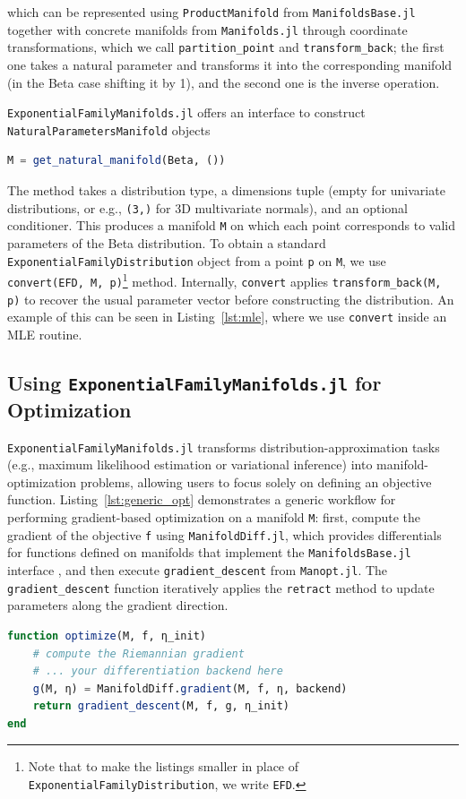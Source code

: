 \documentclass{juliacon}
\begin{document}
which can be represented using \texttt{ProductManifold} from \texttt{ManifoldsBase.jl} together with concrete manifolds from \texttt{Manifolds.jl} through coordinate transformations, which we call \texttt{partition\_point} and \texttt{transform\_back}; the first one takes a natural parameter and transforms it into the corresponding manifold (in the Beta case shifting it by 1), and the second one is the inverse operation.

\texttt{ExponentialFamilyManifolds.jl} offers an interface to construct \texttt{NaturalParametersManifold} objects \begin{lstlisting}[language=Julia]
M = get_natural_manifold(Beta, ())
\end{lstlisting} The method takes a distribution type, a dimensions tuple (empty for univariate distributions, or e.g., \texttt{(3,)} for 3D multivariate normals), and an optional conditioner. This produces a manifold \texttt{M} on which each point corresponds to valid parameters of the Beta distribution. To obtain a standard \texttt{ExponentialFamilyDistribution} object from a point \texttt{p} on \texttt{M}, we use \texttt{convert(EFD, M, p)}\footnote{\label{foot-efd}Note that to make the listings smaller in place of \texttt{ExponentialFamilyDistribution}, we write \texttt{EFD}.} method. Internally, \texttt{convert} applies \texttt{transform\_back(M, p)} to recover the usual parameter vector before constructing the distribution. An example of this can be seen in Listing~\ref{lst:mle}, where we use \texttt{convert} inside an MLE routine.

\subsection{Using \texttt{ExponentialFamilyManifolds.jl} for Optimization} \label{sec:using_efm}

\texttt{ExponentialFamilyManifolds.jl} transforms distribution-approximation tasks 
(e.g., maximum likelihood estimation or variational inference) into manifold-optimization problems, 
allowing users to focus solely on defining an objective function. 
Listing~\ref{lst:generic_opt} demonstrates a generic workflow for performing gradient-based optimization on a manifold \texttt{M}: 
first, compute the gradient of the objective \texttt{f} using \texttt{ManifoldDiff.jl}, which provides differentials for functions defined on manifolds that implement the \texttt{ManifoldsBase.jl} interface \cite{axen_manifoldsjl_2023}, 
and then execute \texttt{gradient\_descent} from \texttt{Manopt.jl}. 
The \texttt{gradient\_descent} function iteratively applies the \texttt{retract} method to update parameters along the gradient direction.
\begin{lstlisting}[language=Julia, caption={Generic manifold-based optimization}, label={lst:generic_opt}]
function optimize(M, f, η_init)
    # compute the Riemannian gradient
    # ... your differentiation backend here
    g(M, η) = ManifoldDiff.gradient(M, f, η, backend)
    return gradient_descent(M, f, g, η_init)
end
\end{lstlisting}
\vspace{1em}
\end{document}
